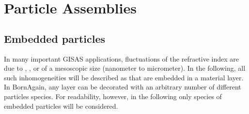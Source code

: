 

\chapter{Particle Assemblies}  \label{sec:Assemblies}


\section{Embedded particles}

\def\sp{\text{p}}
\def\sm{\text{m}}

%
%
%
In many important GISAS applications,
fluctuations of the refractive index are due to
, ,  or 
%
%
%
%
of a mesoscopic size (nanometer to micrometer).
In the following, all such inhomogeneities will be described as
 that are embedded in a material layer.
In BornAgain, any layer can be decorated with an arbitrary number
of different particles species.
For readability, however, in the following
only  species of embedded particles will be considered.

